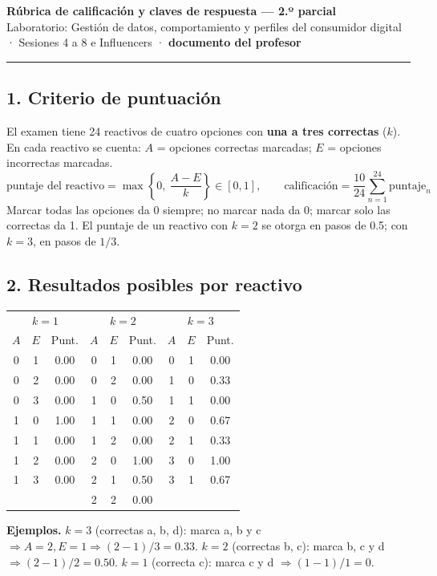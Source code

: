 \documentclass[10pt,letterpaper]{article}
\begin{document}
{\color{guinda}\large\textbf{Rúbrica de calificación y claves de respuesta — 2.º parcial}}\\
{\small Laboratorio: Gestión de datos, comportamiento y perfiles del consumidor digital · Sesiones 4 a 8 e Influencers · \textbf{documento del profesor}}
\vspace{3pt}\hrule\vspace{3pt}
\subsection*{1. Criterio de puntuación}
El examen tiene 24 reactivos de cuatro opciones con \textbf{una a tres correctas} ($k$). En cada reactivo se cuenta: $A$ = opciones correctas marcadas; $E$ = opciones incorrectas marcadas.
\[ \text{puntaje del reactivo}=\max\left\{0,\ \frac{A-E}{k}\right\}\in[0,1],\qquad \text{calificación}=\frac{10}{24}\sum_{n=1}^{24}\text{puntaje}_n \]
Marcar todas las opciones da 0 siempre; no marcar nada da 0; marcar solo las correctas da 1. El puntaje de un reactivo con $k=2$ se otorga en pasos de 0.5; con $k=3$, en pasos de $1/3$.
\subsection*{2. Resultados posibles por reactivo}
\begin{center}\footnotesize\begin{tabular}{@{}ccc@{\hspace{2em}}ccc@{\hspace{2em}}ccc@{}}\toprule
\multicolumn{3}{c}{$k=1$} & \multicolumn{3}{c}{$k=2$} & \multicolumn{3}{c}{$k=3$}\\ $A$ & $E$ & Punt. & $A$ & $E$ & Punt. & $A$ & $E$ & Punt.\\\midrule
0 & 1 & 0.00 & 0 & 1 & 0.00 & 0 & 1 & 0.00\\
0 & 2 & 0.00 & 0 & 2 & 0.00 & 1 & 0 & 0.33\\
0 & 3 & 0.00 & 1 & 0 & 0.50 & 1 & 1 & 0.00\\
1 & 0 & 1.00 & 1 & 1 & 0.00 & 2 & 0 & 0.67\\
1 & 1 & 0.00 & 1 & 2 & 0.00 & 2 & 1 & 0.33\\
1 & 2 & 0.00 & 2 & 0 & 1.00 & 3 & 0 & 1.00\\
1 & 3 & 0.00 & 2 & 1 & 0.50 & 3 & 1 & 0.67\\
&& & 2 & 2 & 0.00 & &&\\
\bottomrule\end{tabular}\end{center}
\textbf{Ejemplos.} $k=3$ (correctas a, b, d): marca a, b y c $\Rightarrow A=2,E=1\Rightarrow(2-1)/3=0.33$. $k=2$ (correctas b, c): marca b, c y d $\Rightarrow(2-1)/2=0.50$. $k=1$ (correcta c): marca c y d $\Rightarrow(1-1)/1=0$.
\end{document}
